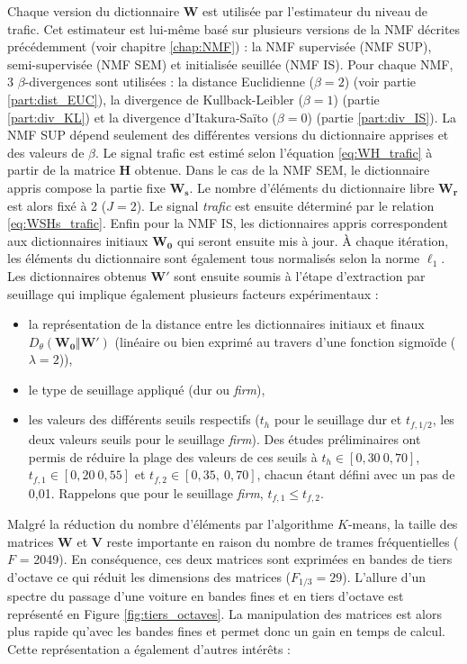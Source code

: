 Chaque version du dictionnaire $\mathbf{W}$ est utilisée par l'estimateur du niveau de trafic. Cet estimateur est lui-même basé sur plusieurs versions de la NMF décrites précédemment (voir chapitre \ref{chap:NMF})  : la NMF supervisée (NMF SUP), semi-supervisée (NMF SEM) et initialisée seuillée (NMF IS). Pour chaque NMF, 3 $\beta$-divergences sont utilisées : la distance Euclidienne ($\beta = 2$) (voir partie \ref{part:dist_EUC}), la divergence de Kullback-Leibler ($\beta = 1$) (partie \ref{part:div_KL}) et la divergence d'Itakura-Saïto ($\beta = 0$) (partie \ref{part:div_IS}). La NMF SUP dépend seulement des différentes versions du dictionnaire apprises et des valeurs de $\beta$. Le signal trafic est estimé selon l'équation \ref{eq:WH_trafic} à partir de la matrice $\mathbf{H}$ obtenue.
Dans le cas de la NMF SEM, le dictionnaire appris compose la partie fixe $\mathbf{W_s}$. Le nombre d'éléments du dictionnaire libre $\mathbf{W_r}$ est alors fixé à 2 ($J = 2$). Le signal \textit{trafic} est ensuite déterminé par le relation \ref{eq:WSHs_trafic}.
Enfin pour la NMF IS, les dictionnaires appris correspondent aux dictionnaires initiaux $\mathbf{W_0}$ qui seront ensuite mis à jour. À chaque itération, les éléments du dictionnaire sont également tous normalisés selon la norme $\ell_1$. Les dictionnaires obtenus $\mathbf{W'}$ sont ensuite soumis à l'étape d'extraction par seuillage qui implique également plusieurs facteurs expérimentaux :

\begin{itemize}
\item la représentation de la distance entre les dictionnaires initiaux et finaux $D_{\theta}(\mathbf{W_0} \Vert \mathbf{W'})$ (linéaire ou bien exprimé au travers d'une fonction sigmoïde ($\lambda = 2$)),
\item le type de seuillage appliqué (dur ou \textit{firm}),
\item les valeurs des différents seuils respectifs ($t_h$ pour le seuillage dur et $t_{f,1/2}$, les deux valeurs seuils pour le seuillage \textit{firm}). Des études préliminaires ont permis de réduire la plage des valeurs de ces seuils à $t_h \in \left[ 0,30~0,70 \right]$, $t_{f,1} \in \left[ 0,20~0,55 \right]$ et $t_{f,2} \in \left[ 0,35,~0,70 \right]$, chacun étant défini avec un pas de 0,01. Rappelons que pour le seuillage \textit{firm}, $t_{f,1} \leq t_{f,2}$.
\end{itemize}

Malgré la réduction du nombre d'éléments par l'algorithme $K$-means, la taille des matrices $\mathbf{W}$ et $\mathbf{V}$ reste importante en raison du nombre de trames fréquentielles ($F$ = 2049). En conséquence, ces deux matrices sont exprimées en bandes de tiers d'octave ce qui réduit les dimensions des matrices ($F_{1/3} = 29$). L'allure d'un spectre du passage d'une voiture en bandes fines et en tiers d'octave est représenté en Figure \ref{fig:tiers_octaves}. La manipulation des matrices est alors plus rapide qu'avec les bandes fines et permet donc un gain en temps de calcul. Cette représentation a également d'autres intérêts :

